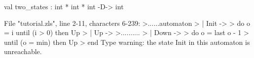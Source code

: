 \chklistingtrue
{}
\begin{ChkListingMsg}
val two_states : int * int * int -D-> int
\end{ChkListingMsg}
\begin{ChkListingErr}
File "tutorial.zls", line 2-11, characters 6-239:
>......automaton
>      | Init ->
>           do o = i until (i > 0) then Up
>      | Up ->
>..........
>      | Down ->
>          do o = last o - 1
>          until (o = min) then Up
>      end
Type warning: the state Init in this automaton is unreachable.
\end{ChkListingErr}
